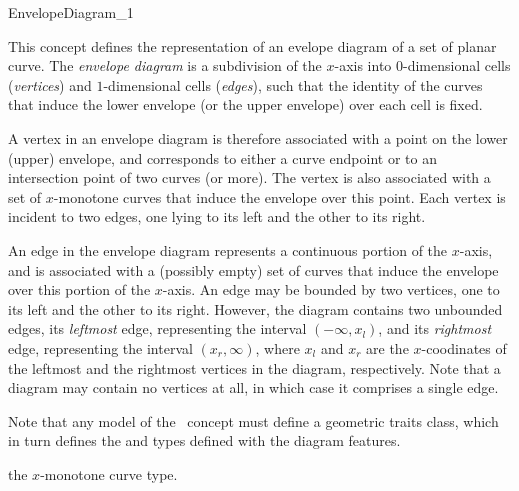 
\ccRefPageBegin

\begin{ccRefConcept}{EnvelopeDiagram_1}

\ccDefinition

This concept defines the representation of an evelope diagram of a set
of planar curve. The {\em envelope diagram} is a subdivision of the $x$-axis
into $0$-dimensional cells ({\em vertices}) and $1$-dimensional cells
({\em edges}), such that the identity of the curves that induce the lower
envelope (or the upper envelope) over each cell is fixed.

A vertex in an envelope diagram is therefore associated with a point
on the lower (upper) envelope, and corresponds to either a curve endpoint
or to an intersection point of two curves (or more). The vertex is also
associated with a set of $x$-monotone curves that induce the envelope
over this point. Each vertex is incident to two edges, one lying to its
left and the other to its right.

An edge in the envelope diagram represents a continuous portion of the
$x$-axis, and is associated with a (possibly empty) set of curves that
induce the envelope over this portion of the $x$-axis. An edge may be bounded
by two vertices, one to its left and the other to its right. However, the
diagram contains two unbounded edges, its {\em leftmost} edge, representing
the interval $(-\infty, x_l)$, and its {\em rightmost} edge, representing the
interval $(x_r, \infty)$, where $x_l$ and $x_r$ are the $x$-coodinates of
the leftmost and the rightmost vertices in the diagram, respectively.
Note that a diagram may contain no vertices at all, in which case it
comprises a single edge.

Note that any model of the \ccRefName\ concept must define a geometric
traits class, which in turn defines the  and 
 types defined with the diagram features.

\ccTypes


\ccGlue
{}
{the $x$-monotone curve type.}


\end{ccRefConcept}
